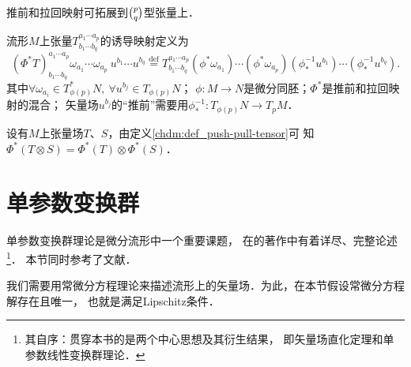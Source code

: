推前和拉回映射可拓展到$\binom{p}{q}$型张量上．
\begin{definition}\label{chdm:def_push-pull-tensor}
    流形$M$上张量$T_{b_1\cdots b_q}^{a_1\cdots a_p}$的诱导映射定义为
    \begin{equation*}
        (\Phi^{*}T)_{b_1\cdots b_q}^{a_1\cdots a_p} \omega_{a_1}\cdots \omega_{a_p}\  u^{b_1} \cdots u^{b_q}
        \overset{\mathrm {def}}{=} T_{b_1\cdots b_q}^{a_1\cdots a_p}
        (\phi^{*}\omega_{a_1})\cdots (\phi^{*}\omega_{a_p})
        (\phi_{*}^{-1}u^{b_1})\cdots (\phi_{*}^{-1}u^{b_q}) .
    \end{equation*}
    其中$\forall \omega_{a_i} \in T^{*}_{\phi(p)}N,\ \forall u^{b_j} \in T_{\phi(p)}N$；
    $\phi:M\to N$是微分同胚；$\Phi^{*}$是推前和拉回映射的混合；
    矢量场$u^{b_j}$的“推前”需要用$\phi_{*}^{-1}:T_{\phi(p)}N\to T_p M$．
\end{definition}

\begin{proposition}\label{chdm:thm_pptt}
    设有$M$上张量场$T$、$S$，由定义\ref{chdm:def_push-pull-tensor}可
    知$\Phi^{*}(T\otimes S) = \Phi^{*}(T) \otimes \Phi^{*}(S)$．
\end{proposition}

%
%
%
%


\section{单参数变换群}\label{chdm:sec_One-Parameter-Transformations-Groups}
单参数变换群理论是微分流形中一个重要课题，
在\textcite{arnold-2001-ode}的著作中有着详尽、完整论述
{\footnote{其自序：贯穿本书的是两个中心思想及其衍生结果，
即矢量场直化定理和单参数线性变换群理论．}}．
本节同时参考了文献\parencite[\S 6.2]{cc2001-zh}．

我们需要用常微分方程理论来描述流形上的矢量场．为此，在本节假设常微分方程解存在且唯一，
也就是满足Lipschitz条件\cite[\S 31]{arnold-2001-ode}．

